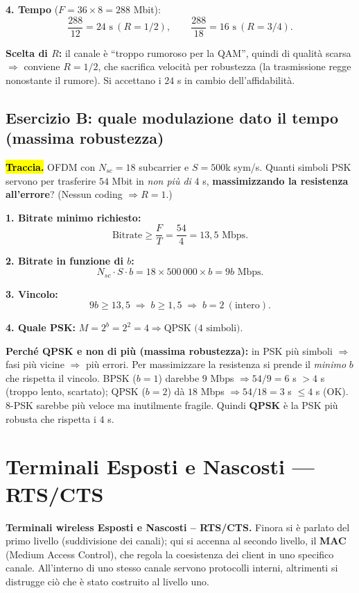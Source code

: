 \documentclass[11pt,a4paper]{report}
\newcommand{\pagemark}[1]{\marginpar{\footnotesize\color{gray}p.#1}}
\begin{document}
\textbf{4. Tempo} ($F = 36\times 8 = 288$ Mbit):
\[ \frac{288}{12} = \boxed{24\text{ s}}\ (R=1/2), \qquad \frac{288}{18} = \boxed{16\text{ s}}\ (R=3/4). \]

\textbf{Scelta di $R$:} il canale è ``troppo rumoroso per la QAM'', quindi di qualità scarsa $\Rightarrow$ conviene $R=1/2$, che sacrifica velocità per robustezza (la trasmissione regge nonostante il rumore). Si accettano i $24$ s in cambio dell'affidabilità.

\subsection*{Esercizio B: quale modulazione dato il tempo (massima robustezza)}

\hl{\textbf{Traccia.}} OFDM con $N_{sc}=18$ subcarrier e $S=500$k sym/s. Quanti simboli PSK servono per trasferire $54$ Mbit in \emph{non più di} $4$ s, \textbf{massimizzando la resistenza all'errore}? (Nessun coding $\Rightarrow R=1$.)

\textbf{1. Bitrate minimo richiesto:}
\[ \text{Bitrate} \ge \frac{F}{T} = \frac{54}{4} = 13{,}5 \text{ Mbps}. \]

\textbf{2. Bitrate in funzione di $b$:}
\[ N_{sc}\cdot S\cdot b = 18\times 500\,000\times b = 9b \text{ Mbps}. \]

\textbf{3. Vincolo:}
\[ 9b \ge 13{,}5 \;\Rightarrow\; b \ge 1{,}5 \;\Rightarrow\; b = 2 \ (\text{intero}). \]

\textbf{4. Quale PSK:} $M = 2^b = 2^2 = 4 \Rightarrow \boxed{\text{QPSK (4 simboli)}}$.

\textbf{Perché QPSK e non di più (massima robustezza):} in PSK più simboli $\Rightarrow$ fasi più vicine $\Rightarrow$ più errori. Per massimizzare la resistenza si prende il \emph{minimo} $b$ che rispetta il vincolo. BPSK ($b=1$) darebbe $9$ Mbps $\Rightarrow 54/9 = 6$ s $> 4$ s (troppo lento, scartato); QPSK ($b=2$) dà $18$ Mbps $\Rightarrow 54/18 = 3$ s $\le 4$ s (OK). $8$-PSK sarebbe più veloce ma inutilmente fragile. Quindi \textbf{QPSK} è la PSK più robusta che rispetta i $4$ s.
\section{Terminali Esposti e Nascosti — RTS/CTS}\pagemark{81}
\textbf{Terminali wireless Esposti e Nascosti -- RTS/CTS.} Finora si è parlato del primo livello (suddivisione dei canali); qui si accenna al secondo livello, il \textbf{MAC} (Medium Access Control), che regola la coesistenza dei client in uno specifico canale. All'interno di uno stesso canale servono protocolli interni, altrimenti si distrugge ciò che è stato costruito al livello uno.
\end{document}
